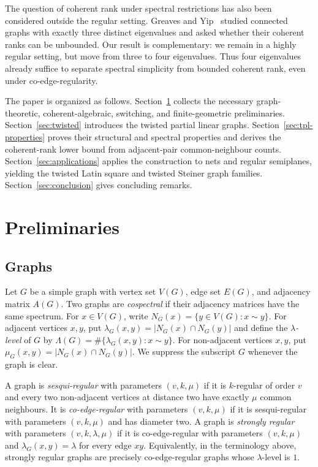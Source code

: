 \documentclass[reqno,a4paper,11pt]{article}
\theoremstyle{definition}
\theoremstyle{remark}
\begin{document}
The question of coherent rank under spectral restrictions has also been considered outside the regular setting.  Greaves and Yip~\cite{gy24} studied connected graphs with exactly three distinct eigenvalues and asked whether their coherent ranks can be unbounded.  Our result is complementary: we remain in a highly regular setting, but move from three to four eigenvalues.  
Thus four eigenvalues already suffice to separate spectral simplicity from bounded coherent rank, even under co-edge-regularity.


 
 The paper is organized as follows.  Section~\ref{sec:preli} collects the
 necessary graph-theoretic, coherent-algebraic, switching, and
 finite-geometric preliminaries.  Section~\ref{sec:twisted} introduces the
 twisted partial linear graphs.  Section~\ref{sec:tpl-properties} proves
 their structural and spectral properties and derives the coherent-rank lower bound from adjacent-pair common-neighbour counts.
   Section~\ref{sec:applications}
 applies the construction to nets and regular semiplanes, yielding the
 twisted Latin square and twisted Steiner graph families.  Section~\ref{sec:conclusion}
 gives concluding remarks. 
 
\section{Preliminaries}\label{sec:preli}

\subsection{Graphs}
Let $G$ be a simple graph with vertex set $V(G)$, edge set $E(G)$, and adjacency matrix $A(G)$.  Two graphs are \emph{cospectral} if their adjacency matrices have the same spectrum.  For $x\in V(G)$, write $N_G(x)=\{y\in V(G):x\sim y\}$.  For adjacent vertices $x,y$, put $\lambda_G(x,y)=|N_G(x)\cap N_G(y)|$ and define the \emph{$\lambda$-level} of $G$ by $\Lambda(G)=\#\{\lambda_G(x,y):x\sim y\}$.  For non-adjacent vertices $x,y$, put $\mu_G(x,y)=|N_G(x)\cap N_G(y)|$.  We suppress the subscript $G$ whenever the graph is clear.

A graph is \emph{sesqui-regular} with parameters $(v,k,\mu)$ if it is $k$-regular of order $v$ and every two non-adjacent vertices at distance two have exactly $\mu$ common neighbours.  It is \emph{co-edge-regular} with parameters $(v,k,\mu)$ if it is sesqui-regular with parameters $(v,k,\mu)$ and has diameter two.  A graph is \emph{strongly regular} with parameters $(v,k,\lambda,\mu)$ if it is co-edge-regular with parameters $(v,k,\mu)$ and $\lambda_G(x,y)=\lambda$ for every edge $xy$.
Equivalently, in the terminology above, strongly regular graphs are precisely co-edge-regular graphs whose $\lambda$-level is $1$.
\end{document}
